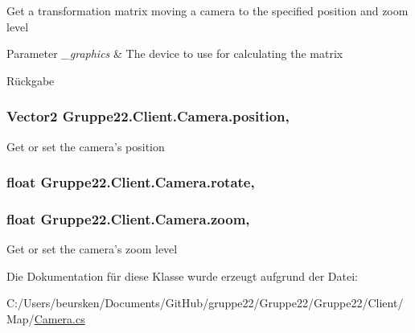 Get a transformation matrix moving a camera to the specified position and zoom level 


\begin{DoxyParams}{Parameter}
{\em \-\_\-graphics} & The device to use for calculating the matrix\\
\hline
\end{DoxyParams}
\begin{DoxyReturn}{Rückgabe}

\end{DoxyReturn}
\hypertarget{class_gruppe22_1_1_client_1_1_camera_a1e2d1783c015ab1a8de5f7a4e6457815}{
\subsubsection[{position}]{\setlength{\rightskip}{0pt plus 5cm}Vector2 Gruppe22.\-Client.\-Camera.\-position\hspace{0.3cm}{\ttfamily [get]}, {\ttfamily [set]}}}\label{class_gruppe22_1_1_client_1_1_camera_a1e2d1783c015ab1a8de5f7a4e6457815}


Get or set the camera's position 

\hypertarget{class_gruppe22_1_1_client_1_1_camera_af79ef77a21b4c349e32e4fd07c1a618b}{
\subsubsection[{rotate}]{\setlength{\rightskip}{0pt plus 5cm}float Gruppe22.\-Client.\-Camera.\-rotate\hspace{0.3cm}{\ttfamily [get]}, {\ttfamily [set]}}}\label{class_gruppe22_1_1_client_1_1_camera_af79ef77a21b4c349e32e4fd07c1a618b}
\hypertarget{class_gruppe22_1_1_client_1_1_camera_aa80119f5c2ba8766d65b2797ded61964}{
\subsubsection[{zoom}]{\setlength{\rightskip}{0pt plus 5cm}float Gruppe22.\-Client.\-Camera.\-zoom\hspace{0.3cm}{\ttfamily [get]}, {\ttfamily [set]}}}\label{class_gruppe22_1_1_client_1_1_camera_aa80119f5c2ba8766d65b2797ded61964}


Get or set the camera's zoom level 



Die Dokumentation für diese Klasse wurde erzeugt aufgrund der Datei\-:\begin{DoxyCompactItemize}
\item 
C\-:/\-Users/beursken/\-Documents/\-Git\-Hub/gruppe22/\-Gruppe22/\-Gruppe22/\-Client/\-Map/\hyperlink{_camera_8cs}{Camera.\-cs}\end{DoxyCompactItemize}
